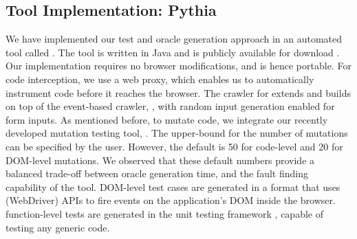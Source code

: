 \subsection{Tool Implementation: Pythia} \label{Sec:tool}
We have implemented our \javascript test and oracle generation approach in an automated tool called \tool. The tool is written in Java and is publicly available for download \cite{pythia-dl}. Our implementation requires no browser modifications, and is hence portable. For \javascript code interception, we use a web proxy, which enables us to automatically instrument \javascript code before it reaches the browser. 
The crawler for \tool extends and builds on top of the  event-based crawler, \crawljax \cite{mesbah:tweb11}, with random input generation enabled for  form inputs.
%
As mentioned before, to mutate \javascript code, we integrate our recently developed mutation testing tool, \mutandis \cite{mirshokraie:icst13}. The upper-bound for the number of mutations can be specified by the 
user. However, the default is 50 for code-level and 20 for DOM-level mutations. We observed that these default numbers  provide a balanced trade-off between oracle generation time, and the fault finding capability of the tool. %
%
DOM-level test cases are generated in a \junit format that uses \selenium (WebDriver) APIs to fire events on the application's DOM inside the browser. \javascript function-level tests are generated in the \qunit unit testing framework \cite{quint}, capable of testing any generic \javascript code. 

